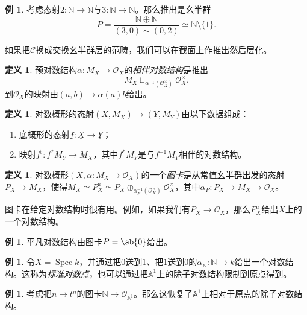 \documentclass{amsart}
\theoremstyle{definition}
\newtheorem{defn}[thm]{定义}
\newtheorem{exm}[thm]{例}
\theoremstyle{remark}
\theoremstyle{plain}
\theoremstyle{definition}
\theoremstyle{remark}
\newcommand{\A}{\mathbb{A}}
\newcommand{\N}{\mathbb{N}}
\newcommand{\mc}[1]{\mathcal{#1}}
\newcommand{\ul}[1]{\underline{#1}}
\newcommand{\1}{\mathbf{1}}
\newcommand{\2}{\mathbf{2}}
\newcommand{\3}{\mathbf{3}}
\DeclareMathOperator{\Spec}{Spec}
\begin{document}
\begin{exm}
    考虑态射\(2 \colon \N \to \N\)与\(3 \colon \N \to \N\)。那么推出是幺半群
    \[ P = \frac{\N \oplus \N}{(3, 0) \sim (0,2)} \simeq \N \setminus \{1\}. \]
\end{exm}

如果把\(\mc{C}\)换成交换幺半群层的范畴，我们可以在截面上作推出然后层化。

\begin{defn}
    预对数结构\(\alpha \colon M_X \to \mc{O}_X\)的\textit{相伴对数结构}是推出
    \[ M_X \sqcup_{\alpha^{-1}(\mc{O}_X^{\times})} \mc{O}_X^{\times}. \]
    到\(\mc{O}_X\)的映射由\((a,b) \to \alpha(a) b\)给出。
\end{defn}

\begin{defn}
    对数概形的态射\((X, M_X) \to (Y, M_Y)\)由以下数据组成：
    \begin{enumerate}
        \item 底概形的态射\(\ul{f} \colon \ul{X} \to \ul{Y}\)；
        \item 映射\(f^{\flat} \colon f^* M_Y \to M_X\)，其中\(f^* M_Y\)是与\(f^{-1} M_Y\)相伴的对数结构。
    \end{enumerate}
\end{defn}

\begin{defn}
    对数概形\((X, \alpha \colon M_X \to \mc{O}_X)\)的一个\textit{图卡}是从常值幺半群出发的态射\(P_X \to M_X\)，使得\(M_X \simeq P_X^a \simeq P_X \oplus_{\alpha_P^{-1}(\mc{O}_X^{\times})} \mc{O}_X^{\times}\)，其中\(\alpha_P \colon P_X \to M_X \to \mc{O}_X\)。
\end{defn}

图卡在给定对数结构时很有用。例如，如果我们有\(P_X \to \mc{O}_X\)，那么\(P_X^a\)给出\(X\)上的一个对数结构。

\begin{exm}
    平凡对数结构由图卡\(P = \ab\{0\}\)给出。
\end{exm}

\begin{exm}
    令\(X = \Spec k\)，并通过把\(0\)送到\(1\)、把\(1\)送到\(0\)的\(\alpha_{\N} \colon \N \to k\)给出一个对数结构。这称为\textit{标准对数点}，也可以通过把\(\A^1\)上的除子对数结构限制到原点得到。
\end{exm}

\begin{exm}
    考虑把\(n \mapsto t^n\)的图卡\(\N \to \mc{O}_{\A^1}\)。那么这恢复了\(\A^1\)上相对于原点的除子对数结构。
\end{exm}
\end{document}
